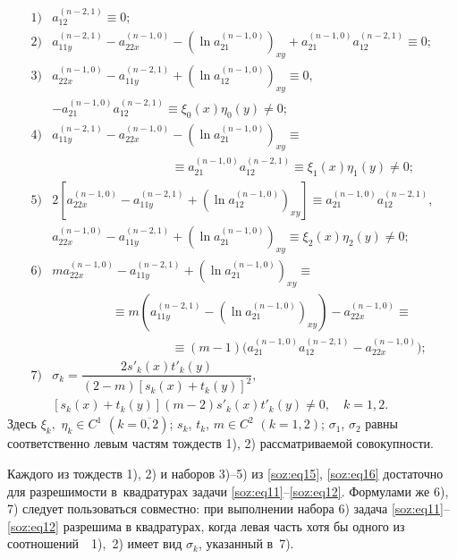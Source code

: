 \begin{equation}
\begin{array}{ll}
1) & a_{12}^{(n-2,1)}\equiv0; 
\\[2mm]
2) & a_{11y}^{(n-2,1)}-a_{22x}^{(n-1,0)}-(\ln a_{21}^{(n-1,0)})_{xy}+a_{21}^{(n-1,0)}a_{12}^{(n-2,1)}\equiv0;  
\\[2mm]
3) & a_{22x}^{(n-1,0)}-a_{11y}^{(n-2,1)}+(\ln a_{12}^{(n-1,0)})_{xy}\equiv0,
\\[2mm]
   & -a_{21}^{(n-1,0)}a_{12}^{(n-2,1)}\equiv\xi_{0}(x)\eta_{0}(y)\neq0;
\\[2mm]
4) & a_{11y}^{(n-2,1)}-a_{22x}^{(n-1,0)}-(\ln a_{21}^{(n-1,0)})_{xy}\equiv 
\\[2mm]
   &  \hspace{4cm}  \equiv a_{21}^{(n-1,0)}a_{12}^{(n-2,1)}\equiv\xi_{1}(x)\eta_{1}(y)\neq0;
\\[2mm]
5) & 2[a_{22x}^{(n-1,0)}-a_{11y}^{(n-2,1)}+(\ln a_{12}^{(n-1,0)})_{xy}]\equiv a_{21}^{(n-1,0)}a_{12}^{(n-2,1)},
\\[2mm]
   & a_{22x}^{(n-1,0)}-a_{11y}^{(n-2,1)}+(\ln a_{21}^{(n-1,0)})_{xy}\equiv\xi_{2}(x)\eta_{2}(y)\neq0;
\\[2mm]
6) & ma_{22x}^{(n-1,0)}-a_{11y}^{(n-2,1)}+(\ln a_{21}^{(n-1,0)})_{xy}\equiv
\\[2mm]
   & \hspace{2cm}  \equiv m(a_{11y}^{(n-2,1)}-(\ln a_{21}^{(n-1,0)})_{xy})-a_{22x}^{(n-1,0)}\equiv
\\[2mm]
   & \hspace{4cm}  \equiv(m-1) \bigl(a_{21}^{(n-1,0)}a_{12}^{(n-2,1)}-a_{22x}^{(n-1,0)} \bigr);
\\[2mm]
7) & \sigma_{k}=\dfrac{2s' _{k}(x)t' _{k}(y)}{(2-m)[s_{k}(x)+t_{k}(y)]^{2}},
\\[3mm] 
   & [s_{k}(x)+t_{k}(y)](m-2)s' _{k}(x)t' _{k}(y)\neq0, \quad  k=1, 2. 
\end{array}
\label{soz:eq16}
\end{equation}
Здесь 
$ \xi_{k},$ $\eta_{k}\in C^{1}$ $(k=\overline{0, 2})$; 
$s_{k}$, $t_{k}$, $m\in C^{2}$ $(k=1, 2)$; 
$\sigma_{1}$, $\sigma_{2}$ равны соответственно левым частям тождеств 1), 2) рассматриваемой совокупности. 

Каждого из тождеств 1), 2) и наборов 3)--5) из \eqref{soz:eq15}, \eqref{soz:eq16} достаточно для разрешимости в~квадратурах задачи \eqref{soz:eq11}--\eqref{soz:eq12}. 
Формулами же 6),  7) следует пользоваться совместно: 
при выполнении набора 6) задача \eqref{soz:eq11}--\eqref{soz:eq12} разрешима в квадратурах,
когда левая часть хотя бы одного из соотношений~\mbox{ 1), 2)} имеет вид $\sigma_{k}$, указанный в~7).

